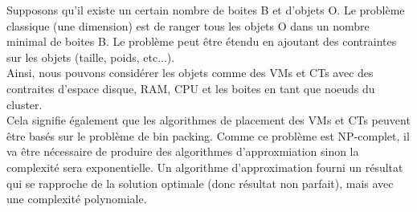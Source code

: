 \documentclass[14pt]{extarticle}
\begin{document}
    Supposons qu'il existe un certain nombre de boites B et d'objets O. Le problème classique (une dimension) est de ranger tous les objets O dans un nombre minimal de boites B. Le problème peut être étendu en ajoutant des contraintes sur les objets (taille, poids, etc...).\\
    Ainsi, nous pouvons considérer les objets comme des VMs et CTs avec des contraites d'espace disque, RAM, CPU et les boites en tant que noeuds du cluster.\\
    Cela signifie également que les algorithmes de placement des VMs et CTs peuvent être basés sur le problème de bin packing. Comme ce problème est NP-complet, il va être nécessaire de produire des algorithmes d'approxmiation sinon la complexité sera exponentielle. Un algorithme d'approximation fourni un résultat qui se rapproche de la solution optimale (donc résultat non parfait), mais avec une complexité polynomiale.
    \newpage
\end{document}

